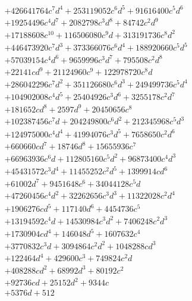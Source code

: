 {\begin{align*}
&+426641764c^{7}d^{4}+253119052c^{6}d^{5}+91616400c^{5}d^{6}\\
&+19254496c^{4}d^{7}+2082798c^{3}d^{8}+84742c^{2}d^{9}\\
&+17188608c^{10}+116506080c^{9}d+313191736c^{8}d^{2}\\
&+446473920c^{7}d^{3}+373366076c^{6}d^{4}+188920660c^{5}d^{5}\\
&+57039154c^{4}d^{6}+9659996c^{3}d^{7}+795508c^{2}d^{8}\\
&+22141cd^{9}+21124960c^{9}+122978720c^{8}d\\
&+286042296c^{7}d^{2}+351126680c^{6}d^{3}+249499736c^{5}d^{4}\\
&+104902008c^{4}d^{5}+25404926c^{3}d^{6}+3255178c^{2}d^{7}\\
&+181652cd^{8}+2597d^{9}+20450656c^{8}\\
&+102387456c^{7}d+204249800c^{6}d^{2}+212345968c^{5}d^{3}\\
&+124975000c^{4}d^{4}+41994076c^{3}d^{5}+7658650c^{2}d^{6}\\
&+660660cd^{7}+18746d^{8}+15655936c^{7}\\
&+66963936c^{6}d+112805160c^{5}d^{2}+96873400c^{4}d^{3}\\
&+45431572c^{3}d^{4}+11455252c^{2}d^{5}+1399914cd^{6}\\
&+61002d^{7}+9451648c^{6}+34044128c^{5}d\\
&+47260456c^{4}d^{2}+32262656c^{3}d^{3}+11322028c^{2}d^{4}\\
&+1906276cd^{5}+117140d^{6}+4454736c^{5}\\
&+13194592c^{4}d+14530984c^{3}d^{2}+7406248c^{2}d^{3}\\
&+1730904cd^{4}+146048d^{5}+1607632c^{4}\\
&+3770832c^{3}d+3094864c^{2}d^{2}+1048288cd^{3}\\
&+122464d^{4}+429600c^{3}+749824c^{2}d\\
&+408288cd^{2}+68992d^{3}+80192c^{2}\\
&+92736cd+25152d^{2}+9344c\\
&+5376d+512
\end{align*}
}

